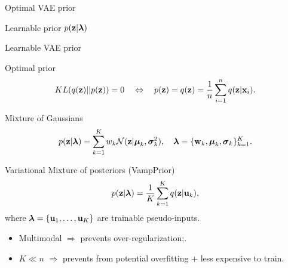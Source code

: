 \begin{frame}{Optimal VAE prior}
\begin{minipage}[t]{0.5\columnwidth}
\begin{block}{Learnable prior $p(\mathbf{z} | \boldsymbol{\lambda})$}
\begin{figure}[h]
			\end{figure}
		\end{block}
	\end{minipage}
\end{frame}
\begin{frame}{Learnable VAE prior}
	\begin{block}{Optimal prior}
		\vspace{-0.4cm}
		\[
			KL(q(\mathbf{z}) || p(\mathbf{z})) = 0 \quad \Leftrightarrow \quad p (\mathbf{z}) = q(\mathbf{z}) = \frac{1}{n} \sum_{i=1}^n q(\mathbf{z} | \mathbf{x}_i).
		\]
		\vspace{-0.4cm}
	\end{block}
	\begin{block}{Mixture of Gaussians}
		\vspace{-0.3cm}
		\[
			p(\mathbf{z} | \boldsymbol{\lambda}) = \sum_{k=1}^K w_k \mathcal{N}(\mathbf{z} | \boldsymbol{\mu}_k, \boldsymbol{\sigma}_k^2), \quad \boldsymbol{\lambda} = \{\mathbf{w}_k, \boldsymbol{\mu}_k, \boldsymbol{\sigma}_k\}_{k=1}^K.
		\]
		\vspace{-0.5cm}
	\end{block}
	\begin{block}{Variational Mixture of posteriors (VampPrior)}
		\vspace{-0.3cm}
		\[
		p(\mathbf{z} | \boldsymbol{\lambda}) = \frac{1}{K} \sum_{k=1}^K q(\mathbf{z} | \mathbf{u}_k),
		\]
		where $\boldsymbol{\lambda} = \{\mathbf{u}_1, \dots, \mathbf{u}_K\}$ are trainable pseudo-inputs.
	\end{block}
	\begin{itemize}
		\item Multimodal $\Rightarrow$ prevents over-regularization;.
		\item $K \ll n$ $\Rightarrow$ prevents from potential overfitting + less expensive to train.
	\end{itemize}
\end{frame}
